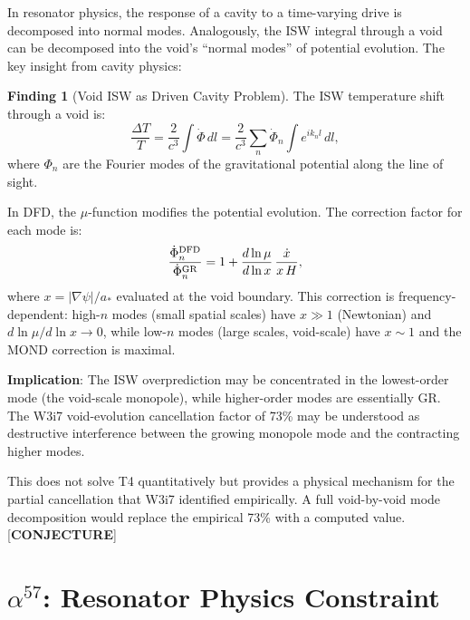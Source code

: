 \documentclass[11pt]{article}
\theoremstyle{definition}
\newtheorem{finding}[theorem]{Finding}
\theoremstyle{remark}
\begin{document}
In resonator physics, the response of a cavity to a time-varying
drive is decomposed into normal modes. Analogously, the ISW integral
through a void can be decomposed into the void's ``normal modes'' of
potential evolution. The key insight from cavity physics:

\begin{finding}[Void ISW as Driven Cavity Problem]
\label{find:void_ISW}
The ISW temperature shift through a void is:
\begin{equation}
\frac{\Delta T}{T} = \frac{2}{c^3}\int \dot{\Phi}\,dl
= \frac{2}{c^3}\sum_n \dot{\Phi}_n \int e^{ik_n l}\,dl,
\label{eq:ISW_modes}
\end{equation}
where $\Phi_n$ are the Fourier modes of the gravitational potential
along the line of sight.

In DFD, the $\mu$-function modifies the potential evolution. The
correction factor for each mode is:
\begin{equation}
\frac{\dot{\Phi}_n^{\rm DFD}}{\dot{\Phi}_n^{\rm GR}}
= 1 + \frac{d\ln\mu}{d\ln x}\,\frac{\dot{x}}{x\,H},
\label{eq:mu_correction}
\end{equation}
where $x = |\nabla\psi|/a_*$ evaluated at the void boundary. This
correction is frequency-dependent: high-$n$ modes (small spatial scales)
have $x \gg 1$ (Newtonian) and $d\ln\mu/d\ln x \to 0$, while low-$n$
modes (large scales, void-scale) have $x \sim 1$ and the MOND correction
is maximal.

\textbf{Implication}: The ISW overprediction may be concentrated in
the lowest-order mode (the void-scale monopole), while higher-order
modes are essentially GR. The W3i7 void-evolution cancellation factor
of 73\% may be understood as destructive interference between the
growing monopole mode and the contracting higher modes.

This does not solve T4 quantitatively but provides a physical mechanism
for the partial cancellation that W3i7 identified empirically. A full
void-by-void mode decomposition would replace the empirical 73\% with
a computed value. [\textbf{CONJECTURE}]
\end{finding}

\section{$\alpha^{57}$: Resonator Physics Constraint}
\label{sec:alpha57}
\end{document}
